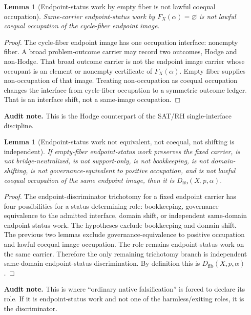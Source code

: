 \documentclass[11pt]{article}
\newtheorem{lemma}[theorem]{Lemma}
\begin{document}
\begin{lemma}[Endpoint-status work by empty fiber is not lawful coequal occupation]
Same-carrier endpoint-status work by $F_X(\alpha)=\varnothing$ is not lawful coequal occupation of the cycle-fiber endpoint image.
\end{lemma}
\begin{proof}
The cycle-fiber endpoint image has one occupation interface: nonempty fiber. A broad problem-outcome carrier may record two outcomes, Hodge and non-Hodge. That broad outcome carrier is not the endpoint image carrier whose occupant is an element or nonempty certificate of $F_X(\alpha)$. Empty fiber supplies non-occupation of that image. Treating non-occupation as coequal occupation changes the interface from cycle-fiber occupation to a symmetric outcome ledger. That is an interface shift, not a same-image occupation.
\end{proof}
\par\noindent\textbf{Audit note.} This is the Hodge counterpart of the SAT/RH single-interface discipline.

\begin{lemma}[Endpoint-status work not equivalent, not coequal, not shifting is independent]
If empty-fiber endpoint-status work preserves the fixed carrier, is not bridge-neutralized, is not support-only, is not bookkeeping, is not domain-shifting, is not governance-equivalent to positive occupation, and is not lawful coequal occupation of the same endpoint image, then it is $D_{\mathrm{fib}}(X,p,\alpha)$.
\end{lemma}
\begin{proof}
The endpoint-discriminator trichotomy for a fixed endpoint carrier has four possibilities for a status-determining role: bookkeeping, governance-equivalence to the admitted interface, domain shift, or independent same-domain endpoint-status work. The hypotheses exclude bookkeeping and domain shift. The previous two lemmas exclude governance-equivalence to positive occupation and lawful coequal image occupation. The role remains endpoint-status work on the same carrier. Therefore the only remaining trichotomy branch is independent same-domain endpoint-status discrimination. By definition this is $D_{\mathrm{fib}}(X,p,\alpha)$.
\end{proof}
\par\noindent\textbf{Audit note.} This is where ``ordinary native falsification'' is forced to declare its role. If it is endpoint-status work and not one of the harmless/exiting roles, it is the discriminator.
\end{document}
